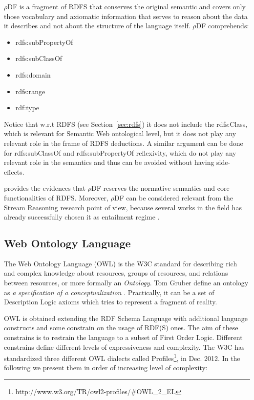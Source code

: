 $\rho$DF is a fragment of RDFS that conserves the original semantic and covers only those vocabulary and axiomatic information that  serves to reason about the data it describes and not about the structure of the language itself. $\rho$DF comprehends:
\begin{itemize}
\item rdfs:subPropertyOf
\item rdfs:subClassOf
\item rdfs:domain 
\item rdfs:range
\item rdf:type 
\end{itemize}

Notice that w.r.t RDFS (see Section~\ref{sec:rdfs}) it does not include the rdfs:Class, which is relevant for Semantic Web ontological level, but it does not play any relevant role in the frame of RDFS deductions. A similar argument can be done for rdfs:subClassOf and rdfs:subPropertyOf reflexivity, which do not play any relevant role in the semantics and thus can be avoided without having side-effects.

\cite{DBLP:conf/esws/MunozPG07} provides the evidences that $\rho$DF reserves the normative semantics and core functionalities of RDFS. Moreover,  $\rho$DF can be considered relevant from  the Stream Reasoning research point of view, because several works in the field  has already successfully chosen it as entailment regime \cite{DBLP:conf/semweb/UrbaniMJHB13, Liu:2014:ERS:2567948.2577323}.

\subsection{Web Ontology Language}\label{sec:owl}

The Web Ontology Language (OWL) is the W3C standard for describing rich and complex knowledge about resources, groups of resources, and relations between resources, or more formally an \textit{Ontology}. Tom Gruber define an ontology as \textit{a specification of a conceptualization} \cite{Gruber:1993:TAP:173743.173747}. Practically, it can be a set of Description Logic axioms which tries to represent a fragment of reality. 

OWL is obtained extending the RDF Schema Language with additional language constructs and some constrain on the usage of RDF(S)  ones. The aim of these constrains is to restrain the language to a subset of First Order Logic. Different constrains define different levels of expressiveness and complexity. The W3C has standardized three different OWL dialects called Profiles\footnote{http://www.w3.org/TR/owl2-profiles/\#OWL\_2\_EL}, in Dec. 2012. In the following we present them in order of increasing level of complexity:

